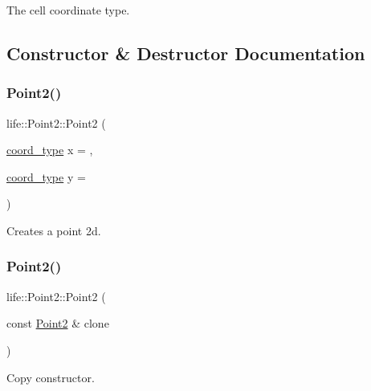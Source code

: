 The cell coordinate type. 



\subsection{Constructor \& Destructor Documentation}
\mbox{\label{structlife_1_1_point2_a7b7c76f2f3c4bd223d451fd4721eb6a5}} 
\subsubsection{\texorpdfstring{Point2()}{Point2()}\hspace{0.1cm}{\footnotesize\ttfamily [1/2]}}
{\footnotesize\ttfamily life\+::\+Point2\+::\+Point2 (\begin{DoxyParamCaption}\item[{\mbox{\hyperlink{structlife_1_1_point2_abc66c92a3ad99b7fb9d8c179213edf58}{coord\+\_\+type}}}]{x = {},  }\item[{\mbox{\hyperlink{structlife_1_1_point2_abc66c92a3ad99b7fb9d8c179213edf58}{coord\+\_\+type}}}]{y = {} }\end{DoxyParamCaption})\hspace{0.3cm}{\ttfamily [inline]}}



Creates a point 2d. 

\mbox{\label{structlife_1_1_point2_ab00bbd691da15470725326c377f3e202}} 
\subsubsection{\texorpdfstring{Point2()}{Point2()}\hspace{0.1cm}{\footnotesize\ttfamily [2/2]}}
{\footnotesize\ttfamily life\+::\+Point2\+::\+Point2 (\begin{DoxyParamCaption}\item[{const \mbox{\hyperlink{structlife_1_1_point2}{Point2}} \&}]{clone }\end{DoxyParamCaption})\hspace{0.3cm}{\ttfamily [inline]}}



Copy constructor. 



